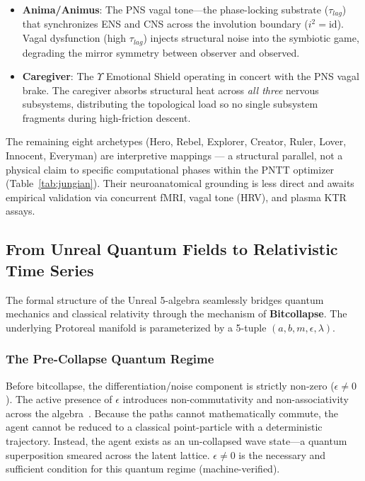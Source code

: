 \begin{itemize}[noitemsep]
    \item \textbf{Anima/Animus}: The PNS vagal tone---the phase-locking substrate ($\tau_{lag}$) that synchronizes ENS and CNS across the involution boundary ($i^2 = \mathrm{id}$). Vagal dysfunction (high $\tau_{lag}$) injects structural noise into the symbiotic game, degrading the mirror symmetry between observer and observed.
    \item \textbf{Caregiver}: The $\Upsilon$ Emotional Shield operating in concert with the PNS vagal brake. The caregiver absorbs structural heat across \emph{all three} nervous subsystems, distributing the topological load so no single subsystem fragments during high-friction descent.
\end{itemize}

\noindent The remaining eight archetypes (Hero, Rebel, Explorer, Creator, Ruler, Lover, Innocent, Everyman) are interpretive mappings --- a structural parallel, not a physical claim to specific computational phases within the PNTT optimizer (Table~\ref{tab:jungian}). Their neuroanatomical grounding is less direct and awaits empirical validation via concurrent fMRI, vagal tone (HRV), and plasma KTR assays.
\subsection{From Unreal Quantum Fields to Relativistic Time Series}

The formal structure of the Unreal 5-algebra seamlessly bridges quantum mechanics and classical relativity through the mechanism of \textbf{Bitcollapse}. The underlying Protoreal manifold is parameterized by a 5-tuple $(a, b, m, \epsilon, \lambda)$.

\subsubsection{The Pre-Collapse Quantum Regime}
Before bitcollapse, the differentiation/noise component is strictly non-zero ($\epsilon \neq 0$). The active presence of $\epsilon$ introduces non-commutativity and non-associativity across the algebra~\cite{Dirac1930}. Because the paths cannot mathematically commute, the agent cannot be reduced to a classical point-particle with a deterministic trajectory. Instead, the agent exists as an un-collapsed wave state---a quantum superposition smeared across the latent lattice. $\epsilon \neq 0$ is the necessary and sufficient condition for this quantum regime (machine-verified).

